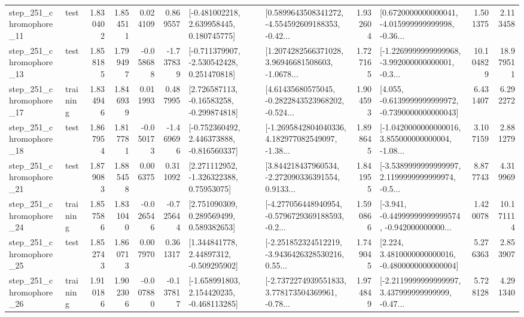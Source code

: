 \begin{tabular}{llrrrrllrlrr}
  step\_251\_chromophore\_11 &      test &      1.830402 &    1.854511 &      0.024109 &  0.869557 &    [-0.481002218, 2.639958445, 0.180745775] &  [0.5899643508341272, -4.554592609188353, -0.42... &       1.932604 &  [0.6720000000000041, -4.015999999999998, -0.36... &            1.501375 &          2.113458 \\
  step\_251\_chromophore\_13 &      test &      1.858185 &    1.799497 &     -0.058688 & -1.737839 &   [-0.711379907, -2.530542428, 0.251470818] &  [1.2074282566371028, 3.96946681508603, -1.0678... &       1.727165 &  [-1.2269999999999968, -3.992000000000001, -0.3... &           10.104829 &         18.979511 \\
  step\_251\_chromophore\_17 &  training &      1.834946 &    1.846939 &      0.011993 &  0.487995 &    [2.726587113, -0.16583258, -0.299874818] &  [4.61435680575045, -0.2822843523968202, -0.524... &       1.904593 &  [4.055, -0.6139999999999972, -0.7390000000000043] &            6.431407 &          6.292272 \\
  step\_251\_chromophore\_18 &      test &      1.867954 &    1.817781 &     -0.050173 & -1.469696 &   [-0.752360492, 2.446373888, -0.816560337] &  [-1.2695842804040336, 4.182977082549097, -1.38... &       1.898645 &  [-1.0420000000000016, 3.855000000000004, -1.08... &            3.107159 &          2.881279 \\
  step\_251\_chromophore\_21 &      test &      1.879083 &    1.885458 &      0.006375 &  0.311092 &     [2.271112952, -1.326322388, 0.75953075] &  [3.844218437960534, -2.272090336391554, 0.9133... &       1.841955 &  [-3.5389999999999997, 2.1199999999999974, -0.5... &            8.877743 &          4.319969 \\
  step\_251\_chromophore\_24 &  training &      1.857586 &    1.831040 &     -0.026546 & -0.725644 &     [2.751090309, 0.289569499, 0.589382653] &  [-4.277056448940954, -0.5796729369188593, -0.2... &       1.590866 &  [-3.941, -0.44999999999999574, -0.942000000000... &            1.420078 &         10.171114 \\
  step\_251\_chromophore\_25 &      test &      1.852743 &    1.860713 &      0.007970 &  0.361317 &     [1.344841778, 2.44897312, -0.509295902] &  [-2.251852324512219, -3.9436426328530216, 0.55... &       1.749045 &   [2.224, 3.4810000000000016, -0.4800000000000004] &            5.276363 &          2.853907 \\
  step\_251\_chromophore\_26 &  training &      1.910186 &    1.902306 &     -0.007880 & -0.137817 &   [-1.658991803, 2.154420235, -0.468113285] &  [-2.7372274939551833, 3.778173504369961, -0.78... &       1.974849 &  [-2.2119999999999997, 3.437999999999999, -0.47... &            5.728128 &          4.291340 \\

\end{tabular}
